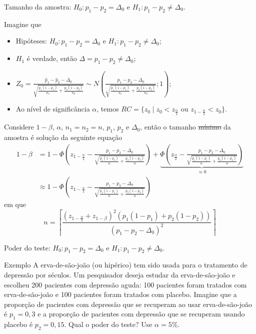 \documentclass[9pt]{beamer}
\begin{document}
\begin{frame}{Tamanho da amostra: $H_0:p_1 - p_2 = \Delta_0$ e $H_1: p_1 - p_2 \neq \Delta_0$.}

\scriptsize
Imagine que
\begin{itemize}
	\item Hipóteses: $H_0: p_1 - p_2 = \Delta_0$ e $H_1: p_1 -  p_2 \neq \Delta_0$;
	\item $H_1$ é verdade, então $\Delta = p_1-p_2 \neq \Delta_0$;
	\item $Z_0 = \frac{\hat{p}_1 - \hat{p}_2 - \Delta_0}{\sqrt{ 
			\frac{p_1(1-p_1)}{n_1} + \frac{p_2(1-p_2)}{n_2} }} \sim N\left( \frac{p_1 - p_2 - \Delta_0}{\sqrt{\frac{p_1(1-p_1)}{n_1} + \frac{p_2(1-p_2)}{n_2}}};1 \right)$;
	\item Ao nível de significância $\alpha$, temos $RC = \{ z_0 \mid z_0 < z_{\frac{\alpha}{2}} \mbox{ ou } z_{1-\frac{\alpha}{2}} < z_0  \}$.
\end{itemize}
\vfill

Considere $1-\beta$, $\alpha$, $n_1=n_2=n$, $p_1$, $p_2$ e $\Delta_0$, então o tamanho \sout{mínimo} da amostra é solução da seguinte equação
\begin{align*}
1-\beta &= 1 - \Phi\left( z_{1-\frac{\alpha}{2}} - \frac{p_1-p_2 - \Delta_0}{\sqrt{\frac{p_1(1-p_1)}{n} + \frac{p_2(1-p_2)}{n}}} \right) + \underbrace{\Phi\left( z_{\frac{\alpha}{2}} - \frac{p_1-p_2 - \Delta_0}{\sqrt{\frac{p_1(1-p_1)}{n} + \frac{p_2(1-p_2)}{n}}} \right)}_{\approx 0}\\
&\approx 1 - \Phi\left( z_{1-\frac{\alpha}{2}} - \frac{p_1-p_2 - \Delta_0}{\sqrt{\frac{p_1(1-p_1)}{n} + \frac{p_2(1-p_2)}{n}}} \right)
\end{align*}
em que 
$$n = \left\lceil \frac{(z_{1-\frac{\alpha}{2}} + z_{1-\beta})^2 \left( p_1(1 - p_1) + p_2(1 - p_2) \right)}{\left(p_1 - p_2 - \Delta_0\right)^2} \right\rceil $$
\normalsize

\end{frame}


\begin{frame}{Poder do teste: $H_0:p_1 - p_2 = \Delta_0$ e $H_1: p_1 - p_2 \neq \Delta_0$.}

\large
\begin{block}{Exemplo}
	A erva-de-são-joão (ou hipérico) tem sido usada para o tratamento de depressão por séculos. Um pesquisador deseja estudar da erva-de-são-joão e escolheu 200 pacientes com depressão aguda: 100 pacientes foram tratados com erva-de-são-joão e 100 pacientes foram tratados com placebo. 
Imagine que a proporção de pacientes com depressão que se recuperam ao usar erva-de-são-joão  é $p_1 = 0,3$ e a proporção de pacientes com depressão que se recuperam usando placebo é $p_2 = 0,15$. 
	Qual o poder do teste? Use $\alpha=5\%$.
\end{block}
\normalsize
\end{frame}
\end{document}
